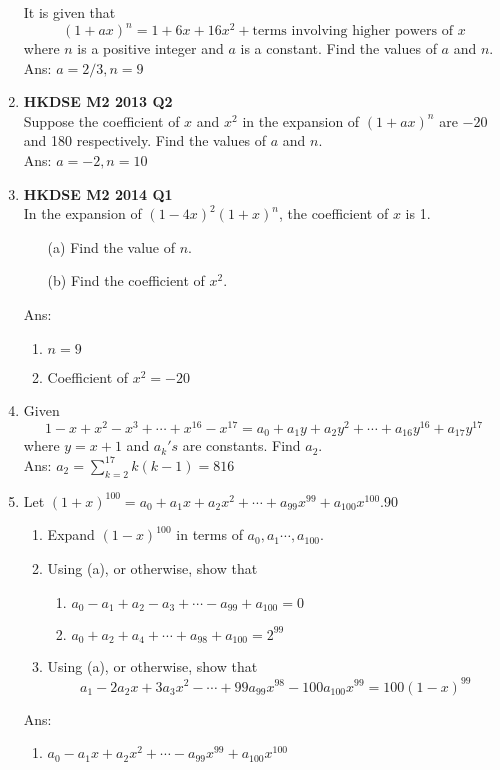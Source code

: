 \documentclass[12pt]{article}
\begin{document}
\begin{enumerate}
	It is given that 
	$$(1+ax)^n = 1 + 6x + 16x^2 + \text{terms involving higher powers of } x$$
	where $n$ is a positive integer and $a$ is a constant. Find the values of $a$ and $n$.\\
	Ans: $a = 2/3 , n = 9$
	\item 
	\textbf{HKDSE M2 2013 Q2}\\	
	Suppose the coefficient of $x$ and $x^2$ in the expansion of $(1+ax)^n$ are $-20$ and 180 respectively. Find the values of $a$ and $n$.\\
	Ans: $a = -2 , n = 10$
	\item 
	\textbf{HKDSE M2 2014 Q1}\\
	In the expansion of $(1-4x)^2(1+x)^n$, the coefficient of $x$ is 1.
	\begin{enumerate}
		\item [(a)]Find the value of $n$. 
		\item [(b)]Find the coefficient of $x^2$.
	\end{enumerate}
	Ans:
	\begin{enumerate}
		\item $n = 9$
		\item Coefficient of $x^2 = -20$
	\end{enumerate}
	\item Given $$1-x+x^2-x^3+\cdots+x^{16}-x^{17} = a_0 + a_1y + a_2y^2 + \cdots + a_{16}y^{16} + a_{17}y^{17}$$ where $y = x+1$ and $a_k's$ are constants. Find $a_2$.\\
	Ans: $a_2 = \displaystyle\sum_{k = 2}^{17} k(k-1) = 816$
	\item Let $(1+x)^{100} = a_0 + a_1x+a_2x^2+\cdots +a_{99}x^{99} + a_{100}x^{100}$.90
	\begin{enumerate}
		\item Expand $(1-x)^{100}$ in terms of $a_0 ,a_1 \cdots , a_{100}$.
		\item Using (a), or otherwise, show that 
		\begin{enumerate}
			\item $a_0 - a_1 + a_2 - a_3 + \cdots - a_{99} + a_{100} = 0$
			\item $a_0 + a_2 + a_4 + \cdots + a_{98} + a_{100} = 2^{99}$
		\end{enumerate}
		\item Using (a), or otherwise, show that $$a_1 - 2a_2x + 3a_3x^2 - \cdots + 99a_{99}x^{98} - 100a_{100}x^{99} = 100(1-x)^{99}$$
	\end{enumerate}
	Ans: 
	\begin{enumerate}
		\item $a_0-a_1x+a_2x^2+\cdots -a_{99}x^{99} + a_{100}x^{100}$
	\end{enumerate}
\end{enumerate}
\end{document}

